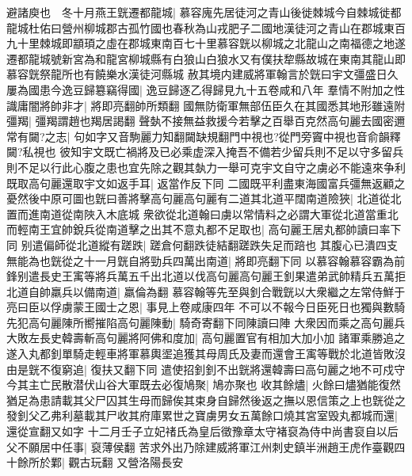 避諸庾也　冬十月燕王皝遷都龍城|{
	慕容廆先居徒河之青山後徙棘城今自棘城徙都龍城杜佑曰營州柳城郡古孤竹國也春秋為山戎肥子二國地漢徒河之青山在郡城東百九十里棘城即顓頊之虛在郡城東南百七十里慕容皝以柳城之北龍山之南福德之地遂遷都龍城號新宮為和龍宮柳城縣有白狼山白狼水又有僕扶犂縣故城在東南其龍山即慕容皝祭龍所也有饒樂水漢徒河縣城}
赦其境内建威將軍翰言於皝曰宇文彊盛日久屢為國患今逸豆歸簒竊得國|{
	逸豆歸逐乙得歸見九十五卷咸和八年}
羣情不附加之性識庸闇將帥非才|{
	將即亮翻帥所類翻}
國無防衛軍無部伍臣久在其國悉其地形雖遠附彊羯|{
	彊羯謂趙也羯居謁翻}
聲埶不接無益救援今若擊之百舉百克然高句麗去國密邇常有闚?之志|{
	句如字又音駒麗力知翻闚缺規翻門中視也?從門旁竇中視也音俞韻釋闚?私視也}
彼知宇文既亡禍將及已必乘虚深入掩吾不備若少留兵則不足以守多留兵則不足以行此心腹之患也宜先除之觀其埶力一舉可克宇文自守之虜必不能遠來争利既取高句麗還取宇文如返手耳|{
	返當作反下同}
二國既平利盡東海國富兵彊無返顧之憂然後中原可圖也皝曰善將擊高句麗高句麗有二道其北道平闊南道險狹|{
	北道從北置而進南道從南陜入木底城}
衆欲從北道翰曰虜以常情料之必謂大軍從北道當重北而輕南王宜帥銳兵從南道擊之出其不意丸都不足取也|{
	高句麗王居丸都帥讀曰率下同}
别遣偏師從北道縱有蹉跌|{
	蹉倉何翻跌徒結翻蹉跌失足而踣也}
其腹心已潰四支無能為也皝從之十一月皝自將勁兵四萬出南道|{
	將即亮翻下同}
以慕容翰慕容霸為前鋒别遣長史王㝢等將兵萬五千出北道以伐高句麗高句麗王釗果遣弟武帥精兵五萬拒北道自帥羸兵以備南道|{
	羸倫為翻}
慕容翰等先至與釗合戰皝以大衆繼之左常侍鮮于亮曰臣以俘虜蒙王國士之恩|{
	事見上卷咸康四年}
不可以不報今日臣死日也獨與數騎先犯高句麗陳所嚮摧陷高句麗陳動|{
	騎奇寄翻下同陳讀曰陣}
大衆因而乘之高句麗兵大敗左長史韓壽斬高句麗將阿佛和度加|{
	高句麗置官有相加大加小加}
諸軍乘勝追之遂入丸都釗單騎走輕車將軍慕輿埿追獲其母周氏及妻而還會王㝢等戰於北道皆敗沒由是皝不復窮追|{
	復扶又翻下同}
遣使招釗釗不出皝將還韓壽曰高句麗之地不可戍守今其主亡民散潜伏山谷大軍既去必復鳩聚|{
	鳩亦聚也}
收其餘燼|{
	火餘曰燼猶能復然}
猶足為患請載其父尸囚其生母而歸俟其束身自歸然後返之撫以恩信策之上也皝從之發釗父乙弗利墓載其尸收其府庫累世之寶虜男女五萬餘口燒其宮室毁丸都城而還|{
	還從宣翻又如字}
十二月壬子立妃禇氏為皇后徵豫章太守褚裒為侍中尚書裒自以后父不願居中任事|{
	裒薄侯翻}
苦求外出乃除建威將軍江州刺史鎮半洲趙王虎作臺觀四十餘所於鄴|{
	觀古玩翻}
又營洛陽長安

